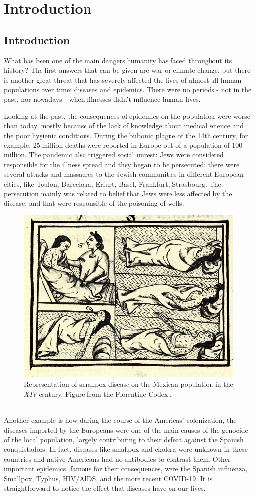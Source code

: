 \part{Introduction}

\chapter{Introduction}

What has been one of the main dangers humanity has faced throughout its history? The first answers that can be given are war or climate change, but there is another great threat that has severely affected the lives of almost all human populations over time: diseases and epidemics. There were no periods - not in the past, nor nowadays - when illnesses didn't influence human lives. 

Looking at the past, the consequences of epidemics on the population were worse than today, mostly because of the lack of knowledge about medical science and the poor hygienic conditions. During the bubonic plague of the 14th century, for example, 25 million deaths were reported in Europe out of a population of 100 million. The pandemic also triggered social unrest: Jews were considered responsible for the illness spread and they began to be persecuted: there were several attacks and massacres to the Jewish communities in different European cities, like Toulon, Barcelona, Erfurt, Basel, Frankfurt, Strasbourg. The persecution mainly was related to belief that Jews were less affected by the disease, and that were responsible of the poisoning of wells.
\begin{figure}[ht]
	\centering
	\includegraphics[width=0.43\linewidth]{0_introduction/images_introduction/FlorentineCodex_smallpox}
	\caption[Smallpox on native Americans]{Representation of smallpox disease on the Mexican population in the $XIV$ century. Figure from the Florentine Codex \cite{Sahagun1965}. }
	\label{fig:florentinecodexsmallpox}
\end{figure}
\\
\newpage
Another example is how during the course of the Americas' colonization, the diseases imported by the Europeans were one of the main causes of the genocide of the local population, largely contributing to their defeat against the Spanish conquistadors. In fact, diseases like smallpox and cholera were unknown in these countries and native Americans had no antibodies to contrast them. 
Other important epidemics, famous for their consequences, were the Spanish influenza, Smallpox, Typhus, HIV/AIDS, and the more recent COVID-19. 
It is straightforward to notice the effect that diseases have on our lives.

